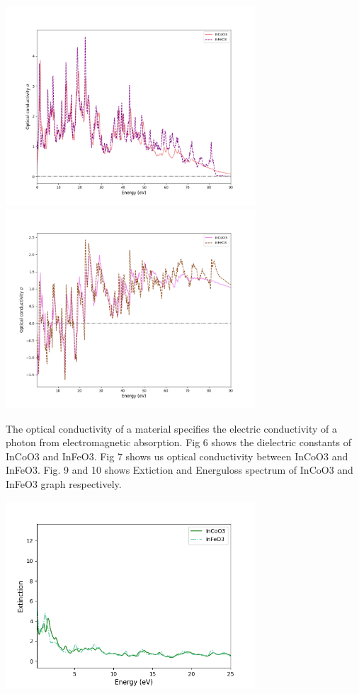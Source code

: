 \documentclass[12pt, letterpaper]{article}
\newcommand*{\1}{\hspace{1pt}}
\begin{document}
    \begin{adjustbox}{center,caption={Optical Conductivity of InCoO3 and InFeO3},label={somelabel},nofloat=figure,vspace=\bigskipamount}
        \includegraphics[width=0.7\textwidth]{opcondrealev}
        \includegraphics[width=0.7\textwidth]{opcondimagev}
    \end{adjustbox}

    The optical conductivity of a material specifies the electric 
    conductivity of a photon from electromagnetic absorption. Fig 6 shows the dielectric constants of InCoO3 and InFeO3. Fig 7 shows us optical conductivity between
    InCoO3 and InFeO3. Fig. 9 and 10 shows Extiction and Energuloss spectrum of InCoO3
    and InFeO3 graph respectively.

    \begin{adjustbox}{center,caption={Extiction graph of INCoO3 and InFeO3},label={somelabel},nofloat=figure,}
        \includegraphics[width=0.7\textwidth]{ex}
    \end{adjustbox}
    
\end{document}
